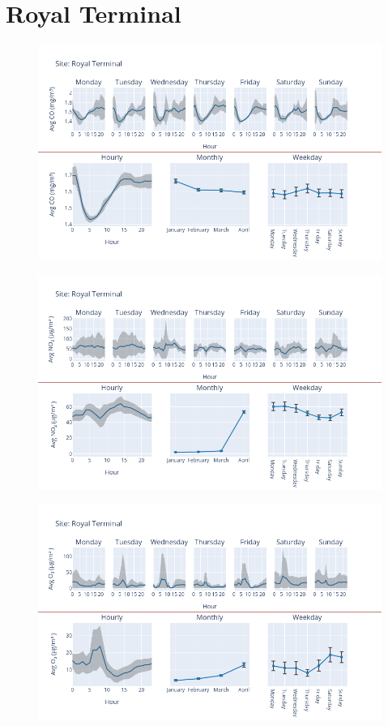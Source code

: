 \documentclass[12pt, oneside]{book}
\begin{document}
{\section{Royal Terminal}
{\begin{figure}[H] 
 \centering 
\includegraphics[width=.88\textwidth, keepaspectratio]{image134} 
 \end{figure}}{} 

{\begin{figure}[H] 
 \centering 
\includegraphics[width=.88\textwidth, keepaspectratio]{image135} 
 \end{figure}}{} 

{\begin{figure}[H] 
 \centering 
\includegraphics[width=.88\textwidth, keepaspectratio]{image136} 
 \end{figure}}{} 

}
\end{document}
